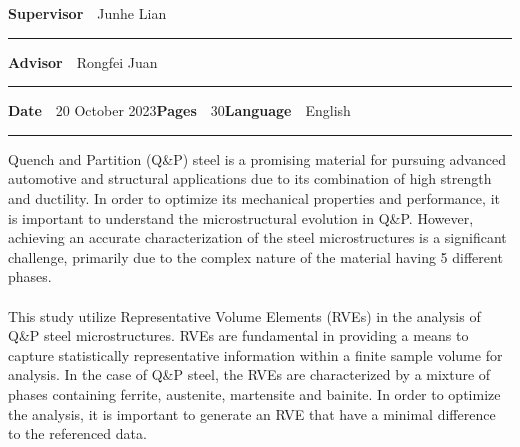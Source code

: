 \begin{spacing}{.88}
{{\fontsize{10.5pt}{10.5pt}\bfseries\sffamily\lsstyle Supervisor}~~{\small Junhe Lian}

\vspace{-2.4mm}\rule{\textwidth}{.75pt}

{\fontsize{10.5pt}{10.5pt}\bfseries\sffamily\lsstyle Advisor}~~{\small Rongfei Juan}

\vspace{-2.4mm}\rule{\textwidth}{.75pt}

{\fontsize{10.5pt}{10.5pt}\bfseries\sffamily\lsstyle Date}~~{\small 20 October 2023}\hfill{\fontsize{10.5pt}{10.5pt}\bfseries\sffamily\lsstyle Pages}~~{\small 30}\hfill{\fontsize{10.5pt}{10.5pt}\bfseries\sffamily\lsstyle Language}~~{\small English}

\vspace{-2.4mm}\rule{\textwidth}{.75pt}

\vspace{6mm}

} %
\end{spacing}
\begin{spacing}{1.05}
\setlength{\parindent}{0pt}
\vspace{.8mm}

{\small
    Quench and Partition (Q\&P) steel is a promising material for pursuing advanced automotive and structural applications due to its combination of high strength and ductility. In order to optimize its mechanical properties and performance, it is important to understand the microstructural evolution in Q\&P. However, achieving an accurate characterization of the steel microstructures is a significant challenge, primarily due to the complex nature of the material having 5 different phases.
    \\\\
    This study utilize Representative Volume Elements (RVEs) in the analysis of Q\&P steel microstructures. RVEs are fundamental in providing a means to capture statistically representative information within a finite sample volume for analysis. In the case of Q\&P steel, the RVEs are characterized by a mixture of phases containing ferrite, austenite, martensite and bainite. In order to optimize the analysis, it is important to generate an RVE that have a minimal difference to the referenced data.  
    
}

\vfill

\end{spacing}
